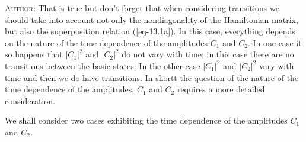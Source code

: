 \documentclass[a4paper,sfsidenotes,colorlinks=true]{tufte-book}
\numberwithin{equation}{section}
\numberwithin{figure}{section}
\begin{document}
\textsc{Author}: That is true but don't forget that when considering
transitions we should take into account not only the nondiagonality of
the Hamiltonian matrix, but also the superposition relation
(\ref{eq-13.1a}). In this case, everything depends on the nature of
the time dependence of the amplitudes $C_{1}$ and $C_{2}$. In one case
it so happens that $|C_{1}|^{2}$ and $|C_{2}|^{2}$ do not vary with
time; in this case there are no transitions between the basic
states. In the other case $|C_{1}|^{2}$ and $|C_{2}|^{2}$ vary with
time and then we do have transitions. In shortt the question of the
nature of the time dependence of the ampljtudes, $C_{1}$ and $C_{2}$
requires a more detailed consideration.

\clearpage

We  shall consider
two cases exhibiting the time dependence of the amplitudes $C_{1}$ and
$C_{2}$.
\end{document}
